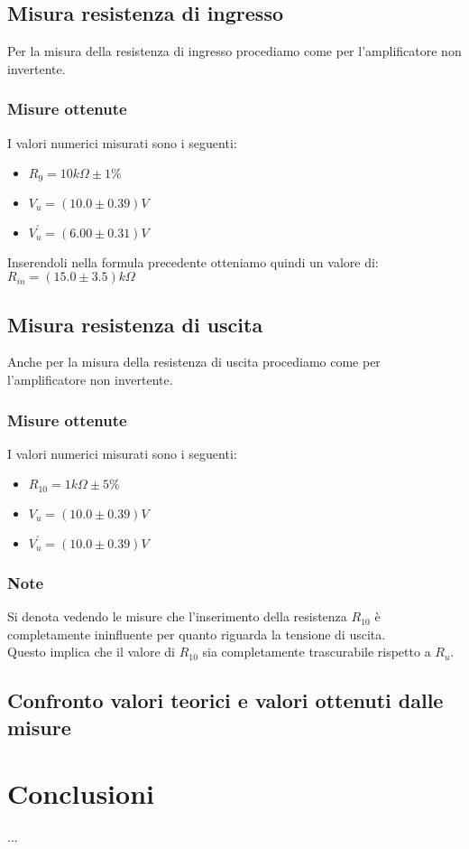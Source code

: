 \documentclass{article}
\begin{document}
\subsection{Misura resistenza di ingresso}
Per la misura della resistenza di ingresso procediamo come per l'amplificatore non invertente.
\subsubsection{Misure ottenute}
I valori numerici misurati sono i seguenti:
\begin{itemize}
	\item \large $R_{9} = 10k\Omega \pm 1\%$
	\item \large $V_{u} = (10.0 \pm 0.39)V$
	\item \large $V_{u}^{'} = (6.00 \pm 0.31)V$
\end{itemize}
Inserendoli nella formula precedente otteniamo quindi un valore di: \\ \large $R_{in} = (15.0 \pm 3.5)k\Omega$
\subsection{Misura resistenza di uscita}
Anche per la misura della resistenza di uscita procediamo come per l'amplificatore non invertente.
\subsubsection{Misure ottenute}
I valori numerici misurati sono i seguenti:
\begin{itemize}
	\item \large $R_{10} = 1k\Omega \pm 5\%$
	\item \large $V_{u} = (10.0 \pm 0.39)V$
	\item \large $V_{u}^{'} = (10.0 \pm 0.39)V$
\end{itemize}
\subsubsection{Note}
Si denota vedendo le misure che l'inserimento della resistenza $R_{10}$ è completamente ininfluente per quanto riguarda la tensione di uscita.\\Questo implica che il valore di $R_{10}$ sia completamente trascurabile rispetto a $R_{u}$.
\subsection{Confronto valori teorici e valori ottenuti dalle misure}

\section{Conclusioni}
...
\end{document}
